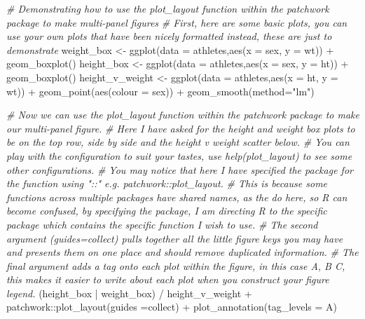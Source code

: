 \documentclass[
]{book}
\newenvironment{Shaded}{\begin{snugshade}}{\end{snugshade}}
\newcommand{\AttributeTok}[1]{\textcolor[rgb]{0.77,0.63,0.00}{#1}}
\newcommand{\CommentTok}[1]{\textcolor[rgb]{0.56,0.35,0.01}{\textit{#1}}}
\newcommand{\FunctionTok}[1]{\textcolor[rgb]{0.00,0.00,0.00}{#1}}
\newcommand{\NormalTok}[1]{#1}
\newcommand{\OtherTok}[1]{\textcolor[rgb]{0.56,0.35,0.01}{#1}}
\newcommand{\SpecialCharTok}[1]{\textcolor[rgb]{0.00,0.00,0.00}{#1}}
\newcommand{\StringTok}[1]{\textcolor[rgb]{0.31,0.60,0.02}{#1}}
\begin{document}
\begin{Shaded}
\begin{Highlighting}[]
\CommentTok{\# Demonstrating how to use the plot\_layout function within the patchwork package to make multi{-}panel figures}
\CommentTok{\# First, here are some basic plots, you can use your own plots that have been nicely formatted instead, these are just to demonstrate}
\NormalTok{weight\_box }\OtherTok{\textless{}{-}} \FunctionTok{ggplot}\NormalTok{(}\AttributeTok{data =}\NormalTok{ athletes,}\FunctionTok{aes}\NormalTok{(}\AttributeTok{x =}\NormalTok{ sex, }\AttributeTok{y =}\NormalTok{ wt)) }\SpecialCharTok{+} 
  \FunctionTok{geom\_boxplot}\NormalTok{() }
\NormalTok{height\_box }\OtherTok{\textless{}{-}} \FunctionTok{ggplot}\NormalTok{(}\AttributeTok{data =}\NormalTok{ athletes,}\FunctionTok{aes}\NormalTok{(}\AttributeTok{x =}\NormalTok{ sex, }\AttributeTok{y =}\NormalTok{ ht)) }\SpecialCharTok{+} 
  \FunctionTok{geom\_boxplot}\NormalTok{() }
\NormalTok{height\_v\_weight }\OtherTok{\textless{}{-}} \FunctionTok{ggplot}\NormalTok{(}\AttributeTok{data =}\NormalTok{ athletes,}\FunctionTok{aes}\NormalTok{(}\AttributeTok{x =}\NormalTok{ ht, }\AttributeTok{y =}\NormalTok{ wt)) }\SpecialCharTok{+} 
  \FunctionTok{geom\_point}\NormalTok{(}\FunctionTok{aes}\NormalTok{(}\AttributeTok{colour =}\NormalTok{ sex)) }\SpecialCharTok{+}
  \FunctionTok{geom\_smooth}\NormalTok{(}\AttributeTok{method=}\StringTok{"lm"}\NormalTok{)}

\CommentTok{\# Now we can use the plot\_layout function within the patchwork package to make our multi{-}panel figure.}
\CommentTok{\# Here I have asked for the height and weight box plots to be on the top row, side by side and the height v weight scatter below.}
\CommentTok{\# You can play with the configuration to suit your tastes, use help(plot\_layout) to see some other configurations.}
\CommentTok{\# You may notice that here I have specified the package for the function using "::" e.g. patchwork::plot\_layout.}
\CommentTok{\# This is because some functions across multiple packages have shared names, as the do here, so R can become confused, by specifying the package, I am directing R to the specific package which contains the specific function I wish to use. }
\CommentTok{\# The second argument (guides=\textquotesingle{}collect\textquotesingle{}) pulls together all the little figure keys you may have and presents them on one place and should remove duplicated information.}
\CommentTok{\# The final argument adds a tag onto each plot within the figure, in this case A, B C, this makes it easier to write about each plot when you construct your figure legend.}
\NormalTok{(height\_box }\SpecialCharTok{|}\NormalTok{ weight\_box) }\SpecialCharTok{/}\NormalTok{ height\_v\_weight }\SpecialCharTok{+} 
\NormalTok{  patchwork}\SpecialCharTok{::}\FunctionTok{plot\_layout}\NormalTok{(}\AttributeTok{guides =}\StringTok{\textquotesingle{}collect\textquotesingle{}}\NormalTok{) }\SpecialCharTok{+}
  \FunctionTok{plot\_annotation}\NormalTok{(}\AttributeTok{tag\_levels =} \StringTok{\textquotesingle{}A\textquotesingle{}}\NormalTok{)}
\end{Highlighting}
\end{Shaded}
\end{document}
